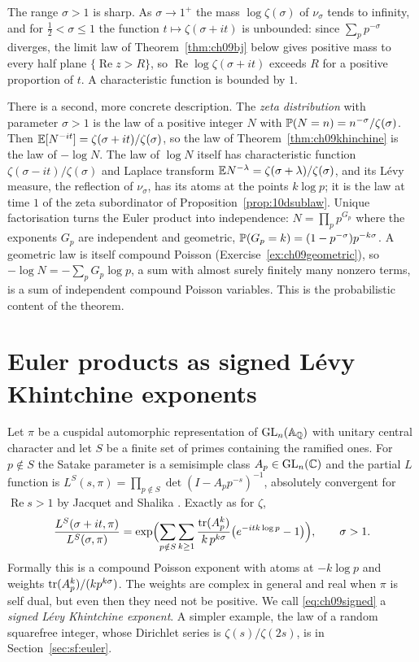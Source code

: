 The range $\sigma>1$ is sharp. As $\sigma\to1^+$ the mass $\log\zeta(\sigma)$ of $\nu_\sigma$ tends to infinity, and for $\frac12<\sigma\le1$ the function $t\mapsto\zeta(\sigma+it)$ is unbounded: since $\sum_pp^{-\sigma}$ diverges, the limit law of Theorem~\ref{thm:ch09bj} below gives positive mass to every half plane $\{\operatorname{Re}z>R\}$, so $\operatorname{Re}\log\zeta(\sigma+it)$ exceeds $R$ for a positive proportion of $t$. A characteristic function is bounded by $1$.

There is a second, more concrete description. The \emph{zeta distribution} with parameter $\sigma>1$ is the law of a positive integer $N$ with $\mathbb{P}(N=n) = n^{-\sigma}/\zeta(\sigma)$. Then $\mathbb{E}[N^{-it}] = \zeta(\sigma+it)/\zeta(\sigma)$, so the law of Theorem~\ref{thm:ch09khinchine} is the law of $-\log N$. The law of $\log N$ itself has characteristic function $\zeta(\sigma-it)/\zeta(\sigma)$ and Laplace transform $\mathbb{E} N^{-\lambda} = \zeta(\sigma+\lambda)/\zeta(\sigma)$, and its L\'evy measure, the reflection of $\nu_\sigma$, has its atoms at the points $k\log p$; it is the law at time $1$ of the zeta subordinator of Proposition~\ref{prop:10dsublaw}. Unique factorisation turns the Euler product into independence: $N = \prod_p p^{G_p}$ where the exponents $G_p$ are independent and geometric, $\mathbb{P}(G_p = k) = (1-p^{-\sigma})p^{-k\sigma}$. A geometric law is itself compound Poisson (Exercise~\ref{ex:ch09geometric}), so $-\log N = -\sum_p G_p \log p$, a sum with almost surely finitely many nonzero terms, is a sum of independent compound Poisson variables. This is the probabilistic content of the theorem.

\section{Euler products as signed L\'evy Khintchine exponents}

Let $\pi$ be a cuspidal automorphic representation of $\mathrm{GL}_n(\mathbb{A}_{\mathbb{Q}})$ with unitary central character and let $S$ be a finite set of primes containing the ramified ones. For $p\notin S$ the Satake parameter is a semisimple class $A_p\in\mathrm{GL}_n(\mathbb{C})$ and the partial $L$ function is $L^S(s,\pi) = \prod_{p\notin S}\det(I - A_p p^{-s})^{-1}$, absolutely convergent for $\operatorname{Re} s > 1$ by Jacquet and Shalika \cite{jacquetshalika1981}. Exactly as for $\zeta$,
\begin{equation}\label{eq:ch09signed}
\frac{L^S(\sigma+it,\pi)}{L^S(\sigma,\pi)} = \exp\Bigl(\sum_{p\notin S}\sum_{k\ge 1} \frac{\operatorname{tr}(A_p^k)}{k\,p^{k\sigma}}\bigl(e^{-itk\log p}-1\bigr)\Bigr), \qquad \sigma>1 .
\end{equation}
Formally this is a compound Poisson exponent with atoms at $-k\log p$ and weights $\operatorname{tr}(A_p^k)/(k p^{k\sigma})$. The weights are complex in general and real when $\pi$ is self dual, but even then they need not be positive. We call \eqref{eq:ch09signed} a \emph{signed L\'evy Khintchine exponent}. A simpler example, the law of a random squarefree integer, whose Dirichlet series is $\zeta(s)/\zeta(2s)$, is in Section~\ref{sec:sf:euler}.


